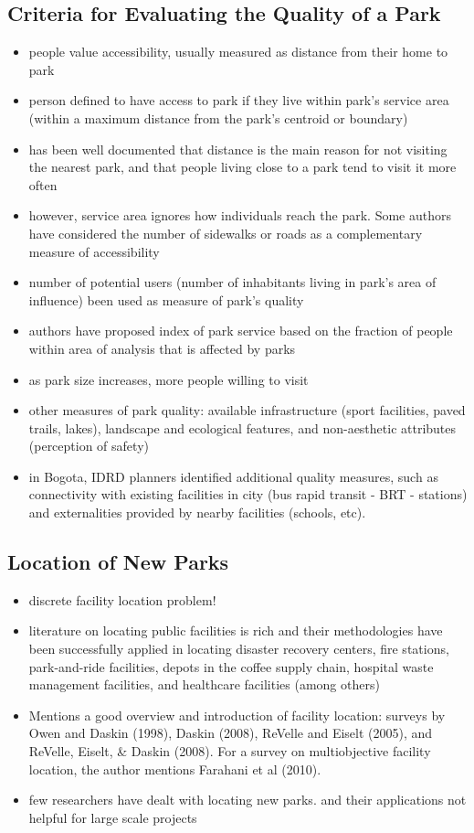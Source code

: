 \documentclass{article}
\begin{document}
\subsection{Criteria for Evaluating the Quality of a Park}
\begin{itemize}
\item people value accessibility, usually measured as distance from their home to park
\item person defined to have access to park if they live within park's service area (within a maximum distance from the park's centroid or boundary)
\item has been well documented that distance is the main reason for not visiting the nearest park, and that people living close to a park tend to visit it more often
\item however, service area ignores how individuals reach the park. Some authors have considered the number of sidewalks or roads as a complementary measure of accessibility
\item number of potential users (number of inhabitants living in park's area of influence) been used as measure of park's quality
\item authors have proposed index of park service based on the fraction of people within area of analysis that is affected by parks
\item as park size increases, more people willing to visit
\item other measures of park quality: available infrastructure (sport facilities, paved trails, lakes), landscape and ecological features, and non-aesthetic attributes (perception of safety)
\item in Bogota, IDRD planners identified additional quality measures, such as connectivity with existing facilities in city (bus rapid transit - BRT - stations) and externalities provided by nearby facilities (schools, etc).
\end{itemize}
%
%
\subsection{Location of New Parks}
\begin{itemize}
\item discrete facility location problem! 
\item literature on locating public facilities is rich and their methodologies have been successfully applied in locating disaster recovery centers, fire stations, park-and-ride facilities, depots in the coffee supply chain, hospital waste management facilities, and healthcare facilities (among others)
\item Mentions a good overview and introduction of facility location: surveys by Owen and Daskin (1998), Daskin (2008), ReVelle and Eiselt (2005), and ReVelle, Eiselt, \& Daskin (2008). For a survey on multiobjective facility location, the author mentions Farahani et al (2010).
\item few researchers have dealt with locating new parks. and their applications not helpful for large scale projects
\end{itemize}
%
%
\end{document}

